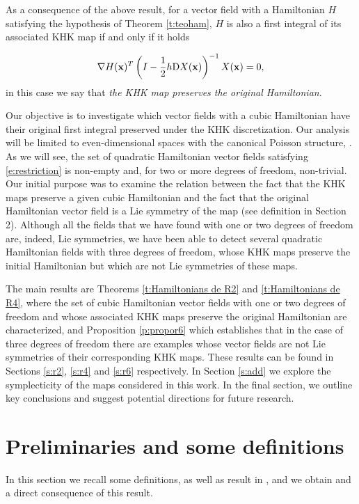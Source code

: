 \documentclass[11pt]{article}
\begin{document}
As a consequence of the above result, for a vector field with a Hamiltonian $H$ satisfying the hypothesis of Theorem \ref{t:teoham},  $H$ is also a first integral of its associated KHK map if and only if it holds

\begin{equation}\label{e:restriction}
  \nabla H({\bf{x}})^T\left(I-\frac{1}{2}h{\mathrm D}X({\bf{x}})\right)^{-1} X({\bf{x}})=0,
\end{equation}
in this case we say that \emph{the KHK map preserves the original Hamiltonian}.



Our objective is to investigate which vector fields with a cubic Hamiltonian have their original first integral preserved under the KHK discretization. Our analysis will be limited to even-dimensional spaces with the canonical Poisson structure, \cite{Celledoni2013}.  As we will see, the set of quadratic Hamiltonian vector fields satisfying \eqref{e:restriction} is non-empty and, for two or more degrees of freedom, non-trivial.
Our initial purpose was to examine the relation between the fact that the KHK maps preserve a given cubic Hamiltonian and the fact that the original Hamiltonian vector field is a Lie symmetry of the map (see definition in Section 2). Although all the fields that we have found with one or two degrees of freedom are, indeed, Lie symmetries, we have been able to detect several quadratic Hamiltonian fields with three degrees of freedom, whose KHK maps preserve the initial Hamiltonian but which are not Lie symmetries
of these maps.



The main results are Theorems \ref{t:Hamiltonians de R2} and \ref{t:Hamiltonians de R4}, where the set of cubic Hamiltonian vector fields  with one or two degrees of freedom and whose associated KHK maps preserve the original Hamiltonian are characterized, and Proposition \ref{p:propor6} which establishes that in the case of three degrees of freedom there are examples whose vector fields are not Lie symmetries of their corresponding KHK maps. These results can be found in Sections \ref{s:r2}, \ref{s:r4} and \ref{s:r6} respectively. In Section \ref{s:add}  we explore the symplecticity of the maps considered in this work. In the final section, we outline key conclusions and suggest potential directions for future research.


\section{Preliminaries and some definitions}\label{s:defi}
In this section we recall some definitions, as well as  result in \cite{Celledoni2013}, and we obtain and a direct consequence of this result.
\end{document}
